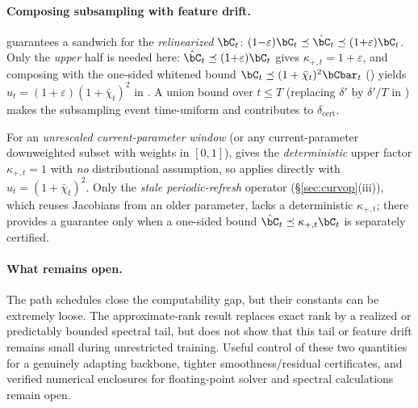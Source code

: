 \paragraph{Composing subsampling with feature drift.}
 guarantees a sandwich for the \emph{relinearized}
$\bC_t$: $(1{-}\varepsilon)\bC_t\preceq\hat\bC_t\preceq(1{+}\varepsilon)\bC_t$.
Only the \emph{upper} half is needed here: $\hat\bC_t\preceq(1{+}\varepsilon)\bC_t$
gives $\kappa_{+,t}=1+\varepsilon$, and composing with the one-sided
whitened bound $\bC_t\preceq(1+\bar\chi_t)^2\bCbar_t$ ()
yields $u_t=(1+\varepsilon)(1+\bar\chi_t)^2$ in
.  A union bound over $t\le T$ (replacing
$\delta'$ by $\delta'/T$ in ) makes the subsampling
event time-uniform and contributes to $\delta_{\mathrm{cert}}$.

For an \emph{unrescaled current-parameter window} (or any current-parameter
downweighted subset with weights in $[0,1]$),  gives the
\emph{deterministic} upper factor $\kappa_{+,t}=1$ with \emph{no} distributional
assumption, so  applies directly with
$u_t=(1+\bar\chi_t)^2$.  Only the \emph{stale periodic-refresh} operator
(\S\ref{sec:curvop}(iii)), which reuses Jacobians from an older parameter, lacks
a deterministic $\kappa_{+,t}$; there  provides a
guarantee only when a one-sided bound $\hat\bC_t\preceq\kappa_{+,t}\bC_t$ is
separately certified.

\paragraph{What remains open.}
The path schedules close the computability gap, but their constants can be
extremely loose.  The approximate-rank result replaces exact rank by a realized
or predictably bounded spectral tail, but does not show that this tail or feature
drift remains small during unrestricted training.  Useful control of these two
quantities for a genuinely adapting backbone, tighter smoothness/residual
certificates, and verified numerical enclosures for floating-point solver and
spectral calculations remain open.
